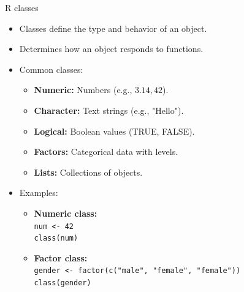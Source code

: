 \documentclass[aspectratio=169]{beamer}
\begin{document}
\begin{frame}{R classes}
    \begin{itemize}
        \item Classes define the type and behavior of an object.\smallskip
        \item Determines how an object responds to functions.\smallskip
        \item Common classes:
        \begin{itemize}
            \item[$\bullet$] \textbf{Numeric:} Numbers (e.g., $3.14, 42$).
            \item[$\bullet$] \textbf{Character:} Text strings (e.g., "Hello").
            \item[$\bullet$] \textbf{Logical:} Boolean values (TRUE, FALSE).
            \item[$\bullet$] \textbf{Factors:} Categorical data with levels.
            \item[$\bullet$] \textbf{Lists:} Collections of objects.\smallskip
        \end{itemize}
        \item Examples:
        \begin{itemize}
        \item[$\bullet$] \textbf{Numeric class:} \\
            \texttt{num <- 42} \\
            \texttt{class(num)}
        \item[$\bullet$] \textbf{Factor class:} \\
            \texttt{gender <- factor(c("male", "female", "female"))} \\
            \texttt{class(gender)}
    \end{itemize}
    \end{itemize}
\end{frame}
\end{document}
